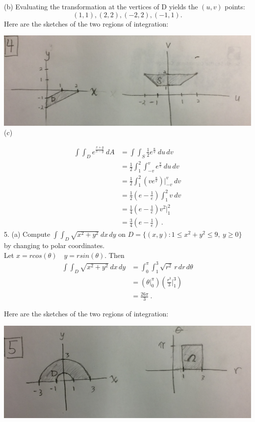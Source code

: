 \documentclass[11pt]{article}
\begin{document}
(b) Evaluating the transformation at the vertices of D yields the $(u,v)$ points:
$$(1,1),(2,2),(-2,2),(-1,1).$$
Here are the sketches of the two regions of integration:

\includegraphics[scale= 0.15]{P4}
\\

(c)

\begin{align*}
\int \int_D e^{\frac{x+y}{x-y}} \: dA & = \int \int_S \frac{1}{2} e^{\frac{u}{v}} \: du \, dv \\
& =\frac{1}{2} \int_{1}^{2} \int_{-v}^{v} e^{\frac{u}{v}} \: du \, dv \\
& =\frac{1}{2} \int_{1}^{2} \left(ve^{\frac{u}{v}}\right) \Bigr\rvert_{-v}^{v} \: dv \\ 
& = \frac{1}{2} \left(e - \frac{1}{e} \right)\int_{1}^{2} v \: dv \\
& = \frac{1}{4} \left(e - \frac{1}{e} \right) v^2 \Bigr\rvert_{1}^{2} \\
& = \frac{3}{4} \left(e - \frac{1}{e} \right) \:.
\end{align*}
5. (a) Compute $\int \int_D \sqrt{x^2 + y^2} \: dx \, dy$ on $ D = \{(x,y) : 1 \leq x^2 + y^2 \leq 9, \: y \geq 0 \} $ by changing to polar coordinates. 
\\

Let $ x = rcos(\theta) \quad y = rsin(\theta)$. Then \begin{align*}
\int \int_D \sqrt{x^2 + y^2} \: dx \, dy &= \int_{0}^{\pi} \int_{1}^{3} \sqrt{r^2} \, r \, dr \, d\theta \\ & = \left(\theta \Bigr\rvert_{0}^{\pi} \right) \left( \frac{r^3}{3} \Bigr\rvert_{1}^{3} \right) \\
& = \frac{26\pi}{3} \:.
\end{align*}

Here are the sketches of the two regions of integration:

\includegraphics[scale= 0.15]{P5}
\\
\end{document}

